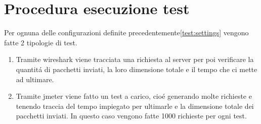 \section{Procedura esecuzione test}
Per ognuna delle configurazioni definite precedentemente\ref{test:settings} vengono fatte 2 tipologie di test.
\begin{enumerate}
  \item Tramite wireshark viene tracciata una richiesta al server per poi verificare la quantitá di pacchetti inviati, la loro dimensione totale e il tempo che ci mette ad ultimare.
  \item Tramite jmeter viene fatto un test a carico, cioé generando molte richieste e tenendo traccia del tempo impiegato per ultimarle e la dimensione totale dei pacchetti inviati. In questo caso vengono fatte 1000 richieste per ogni test.

\end{enumerate}

